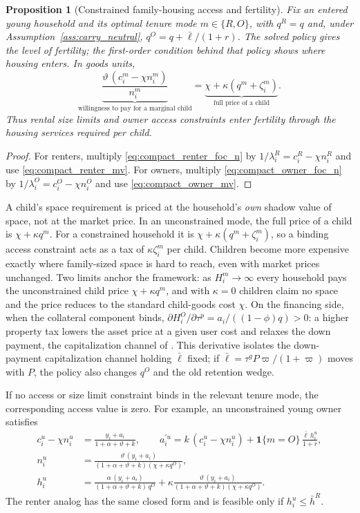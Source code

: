 \documentclass[11pt]{article}
\newtheorem{proposition}{Proposition}
\newcommand{\1}{\mathbf 1}
\begin{document}
\begin{proposition}[Constrained family-housing access and fertility]
Fix an entered young household and its optimal tenure mode $m\in\{R,O\}$, with $q^R=q$ and, under Assumption~\ref{ass:carry_neutral}, $q^O=q+\bar\ell/(1+r)$. The solved policy gives the level of fertility; the first-order condition behind that policy shows where housing enters. In goods units,
\[
\underbrace{\frac{\vartheta\,(c_i^m-\chi n_i^m)}{n_i^m}}_{\text{willingness to pay for a marginal child}}
=
\underbrace{\chi+\kappa(q^m+\zeta_i^m)}_{\text{full price of a child}} .
\]
Thus rental size limits and owner access constraints enter fertility through the housing services required per child.
\end{proposition}

\begin{proof}
For renters, multiply \eqref{eq:compact_renter_foc_n} by $1/\lambda_i^R=c_i^R-\chi n_i^R$ and use \eqref{eq:compact_renter_mv}. For owners, multiply \eqref{eq:compact_owner_foc_n} by $1/\lambda_i^O=c_i^O-\chi n_i^O$ and use \eqref{eq:compact_owner_mv}.
\end{proof}

A child's space requirement is priced at the household's \emph{own} shadow value of space, not at the market price. In an unconstrained mode, the full price of a child is $\chi+\kappa q^m$. For a constrained household it is $\chi+\kappa(q^m+\zeta_i^m)$, so a binding access constraint acts as a tax of $\kappa\zeta_i^m$ per child. Children become more expensive exactly where family-sized space is hard to reach, even with market prices unchanged. Two limits anchor the framework: as $H_i^m\to\infty$ every household pays the unconstrained child price $\chi+\kappa q^m$, and with $\kappa=0$ children claim no space and the price reduces to the standard child-goods cost $\chi$. On the financing side, when the collateral component binds, $\partial H_i^O/\partial\tau^p=a_i/((1-\phi)q)>0$: a higher property tax lowers the asset price at a given user cost and relaxes the down payment, the capitalization channel of \citet{coven2024}. This derivative isolates the down-payment capitalization channel holding $\bar\ell$ fixed; if $\bar\ell=\tau^gP\varpi/(1+\varpi)$ moves with $P$, the policy also changes $q^O$ and the old retention wedge.

If no access or size limit constraint binds in the relevant tenure mode, the corresponding access value is zero. For example, an unconstrained young owner satisfies
\begin{align*}
c_i^u-\chi n_i^u&=\frac{y_i+a_i}{1+\alpha+\vartheta+k},
\qquad
a_i^{\prime u}=k\,(c_i^u-\chi n_i^u)+\1\{m=O\}\,\frac{\bar\ell\,h_i^u}{1+r},
\\
n_i^u&=\frac{\vartheta\,(y_i+a_i)}{(1+\alpha+\vartheta+k)(\chi+\kappa q^O)},
\\
h_i^u&=\frac{\alpha\,(y_i+a_i)}{(1+\alpha+\vartheta+k)\,q^O}
+
\kappa\frac{\vartheta\,(y_i+a_i)}{(1+\alpha+\vartheta+k)(\chi+\kappa q^O)}.
\end{align*}
The renter analog has the same closed form and is feasible only if $h_i^u\le\bar h^R$.
\end{document}
